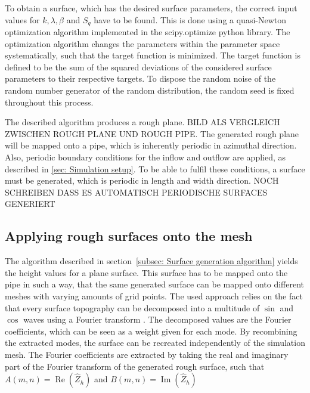 To obtain a surface, which has the desired surface parameters, the correct input values for $k, \lambda, \beta$ and $S_q$ have to be found.
This is done using a quasi-Newton optimization algorithm implemented in the scipy.optimize python library.
The optimization algorithm changes the parameters within the parameter space systematically, such that the target function is minimized.
The target function is defined to be the sum of the squared deviations of the considered surface parameters to their respective targets.
To dispose the random noise of the random number generator of the random distribution, the random seed is fixed throughout this process.

The described algorithm produces a rough plane.
BILD ALS VERGLEICH ZWISCHEN ROUGH PLANE UND ROUGH PIPE.
The generated rough plane will be mapped onto a pipe, which is inherently periodic in azimuthal direction.
Also, periodic boundary conditions for the inflow and outflow are applied, as described in \autoref{sec: Simulation setup}.
To be able to fulfil these conditions, a surface must be generated, which is periodic in length and width direction.
NOCH SCHREIBEN DASS ES AUTOMATISCH PERIODISCHE SURFACES GENERIERT

\subsection{Applying rough surfaces onto the mesh}\label{subsec: Generating rough mesh}
The algorithm described in section~\ref{subsec: Surface generation algorithm} yields the height values for a plane surface.
This surface has to be mapped onto the pipe in such a way, that the same generated surface can be mapped onto different meshes with varying amounts of grid points.
The used approach relies on the fact that every surface topography can be decomposed into a multitude of $\sin$ and $\cos$ waves using a Fourier transform \citep{perez-rafolsGeneratingRandomlyRough2019}.
The decomposed values are the Fourier coefficients, which can be seen as a weight given for each mode.
By recombining the extracted modes, the surface can be recreated independently of the simulation mesh.
The Fourier coefficients are extracted by taking the real and imaginary part  of the Fourier transform of the generated rough surface, such that $A(m,n) = \operatorname{Re}\left(\hat{Z}_h\right)$ and $B(m,n) = \operatorname{Im}\left(\hat{Z}_h\right)$

